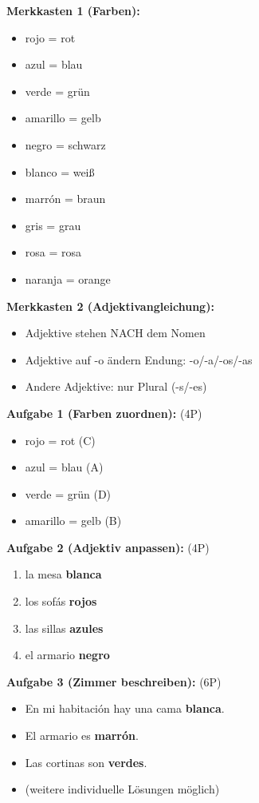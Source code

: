 \documentclass[11pt,a4paper]{article}
\begin{document}
\textbf{Merkkasten 1 (Farben):}
\begin{itemize}
    \item rojo = rot
    \item azul = blau
    \item verde = grün
    \item amarillo = gelb
    \item negro = schwarz
    \item blanco = weiß
    \item marrón = braun
    \item gris = grau
    \item rosa = rosa
    \item naranja = orange
\end{itemize}

\textbf{Merkkasten 2 (Adjektivangleichung):}
\begin{itemize}
    \item Adjektive stehen NACH dem Nomen
    \item Adjektive auf -o ändern Endung: -o/-a/-os/-as
    \item Andere Adjektive: nur Plural (-s/-es)
\end{itemize}

\textbf{Aufgabe 1 (Farben zuordnen):} (4P)
\begin{itemize}
    \item rojo = rot (C)
    \item azul = blau (A)
    \item verde = grün (D)
    \item amarillo = gelb (B)
\end{itemize}

\textbf{Aufgabe 2 (Adjektiv anpassen):} (4P)
\begin{enumerate}[label=\alph*)]
    \item la mesa \textbf{blanca}
    \item los sofás \textbf{rojos}
    \item las sillas \textbf{azules}
    \item el armario \textbf{negro}
\end{enumerate}

\textbf{Aufgabe 3 (Zimmer beschreiben):} (6P)
\begin{itemize}
    \item En mi habitación hay una cama \textbf{blanca}.
    \item El armario es \textbf{marrón}.
    \item Las cortinas son \textbf{verdes}.
    \item (weitere individuelle Lösungen möglich)
\end{itemize}
\end{document}
